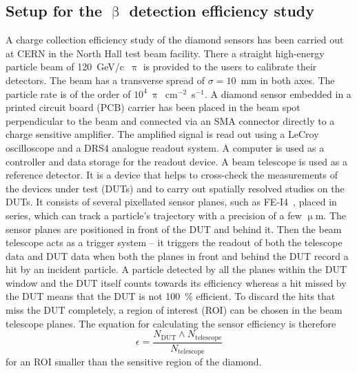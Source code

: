 \subsection{Setup for the $\upbeta$ detection efficiency study}
A charge collection efficiency study of the diamond sensors has been carried out at CERN in the North Hall test beam facility. There a straight high-energy particle beam of 120~GeV/c~$\uppi$ is provided to the users to calibrate their detectors. The beam has a transverse spread of $\sigma=10$~mm in both axes. The particle rate is of the order of $10^4~\uppi$~cm$^{-2}$~s$^{-1}$. A diamond sensor embedded in a printed circuit board (PCB) carrier has been placed in the beam spot perpendicular to the beam and connected via an SMA connector directly to a charge sensitive amplifier. The amplified signal is read out using a LeCroy oscilloscope and a DRS4 analogue readout system. A computer is used as a controller and data storage for the readout device. A beam telescope is used as a reference detector. It is a device that helps to cross-check the measurements of the devices under test (DUTs) and to carry out spatially resolved studies on the DUTs. It consists of several pixellated sensor planes, such as FE-I4~\cite{ATLIBL:00001}, placed in series, which can track a particle's trajectory with a precision of a few $\upmu$m. The sensor planes are positioned in front of the DUT and behind it. Then the beam telescope acts as a trigger system -- it triggers the readout of both the telescope data and DUT data when both the planes in front and behind the DUT record a hit by an incident particle. A particle detected by all the planes within the DUT window and the DUT itself counts towards its efficiency whereas a hit missed by the DUT means that the DUT is not 100~\% efficient. To discard the hits that miss the DUT completely, a region of interest (ROI) can be chosen in the beam telescope planes. The equation for calculating the sensor efficiency is therefore
\begin{equation}
\label{eq:sensoreff}
\epsilon = \frac{ N_\mathrm{DUT} \wedge N_\mathrm{telescope} }{ N_\mathrm{telescope} }
\end{equation}
for an ROI smaller than the sensitive region of the diamond.


